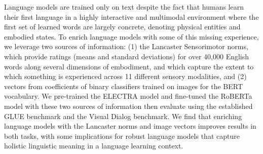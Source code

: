 Language models are trained only on text despite the fact that humans learn their first language in a highly interactive and multimodal environment where the first set of learned words are largely concrete, denoting physical entities and embodied states. To enrich language models with some of this missing experience, we leverage two sources of information: (1) the Lancaster Sensorimotor norms, which provide ratings (means and standard deviations) for over 40,000 English words along several dimensions of embodiment, and which capture the extent to which something is experienced across 11 different sensory modalities, and (2) vectors from coefficients of binary classifiers trained on images for the BERT vocabulary. We pre-trained the ELECTRA model and fine-tuned the RoBERTa model with these two sources of information then evaluate using the established GLUE benchmark and the Visual Dialog benchmark. We find that enriching language models with the Lancaster norms and image vectors improves results in both tasks, with some implications for robust language models that capture holistic linguistic meaning in a language learning context.
